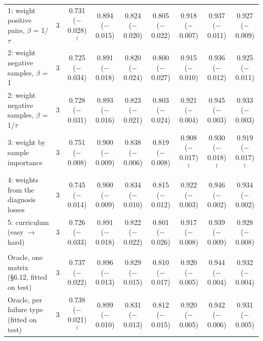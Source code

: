 \begin{table}[t]
{\begin{tabular}{l c c c c c c c c}
1: weight positive pairs, $\beta$ = 1/$\tau$ & 3 & 0.731 ($-$0.028)$^{\dagger}$ & 0.894 ($-$0.015) & 0.824 ($-$0.020) & 0.805 ($-$0.022) & 0.918 ($-$0.007) & 0.937 ($-$0.011) & 0.927 ($-$0.009) \\
2: weight negative samples, $\beta$ = 1 & 3 & 0.725 ($-$0.034) & 0.891 ($-$0.018) & 0.820 ($-$0.024) & 0.800 ($-$0.027) & 0.915 ($-$0.010) & 0.936 ($-$0.012) & 0.925 ($-$0.011) \\
2: weight negative samples, $\beta$ = 1/$\tau$ & 3 & 0.728 ($-$0.031) & 0.893 ($-$0.016) & 0.823 ($-$0.021) & 0.803 ($-$0.024) & 0.921 ($-$0.004) & 0.945 ($-$0.003) & 0.933 ($-$0.003) \\
3: weight by sample importance & 3 & 0.751 ($-$0.008) & 0.900 ($-$0.009) & 0.838 ($-$0.006) & 0.819 ($-$0.008) & 0.908 ($-$0.017)$^{\dagger}$ & 0.930 ($-$0.018)$^{\dagger}$ & 0.919 ($-$0.017)$^{\dagger}$ \\
4: weights from the diagnosis losses & 3 & 0.745 ($-$0.014) & 0.900 ($-$0.009) & 0.834 ($-$0.010) & 0.815 ($-$0.012) & 0.922 ($-$0.003) & 0.946 ($-$0.002) & 0.934 ($-$0.002) \\
5: curriculum (easy $\rightarrow$ hard) & 3 & 0.726 ($-$0.033) & 0.891 ($-$0.018) & 0.822 ($-$0.022) & 0.801 ($-$0.026) & 0.917 ($-$0.008) & 0.939 ($-$0.009) & 0.928 ($-$0.008) \\
\addlinespace
\multicolumn{9}{l}{\emph{Upper bound}} \\
Oracle, one matrix (\S6.12, fitted on test) & 3 & 0.737 ($-$0.022) & 0.896 ($-$0.013) & 0.829 ($-$0.015) & 0.810 ($-$0.017) & 0.920 ($-$0.005) & 0.944 ($-$0.004) & 0.932 ($-$0.004) \\
Oracle, per failure type (fitted on test) & 3 & 0.738 ($-$0.021)$^{\dagger}$ & 0.899 ($-$0.010) & 0.831 ($-$0.013) & 0.812 ($-$0.015) & 0.920 ($-$0.005) & 0.942 ($-$0.006) & 0.931 ($-$0.005) \\
\bottomrule
\end{tabular}}
\end{table}
